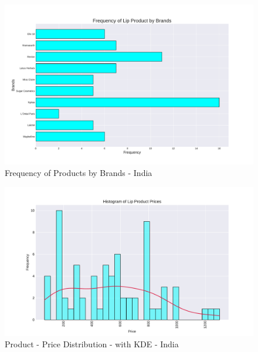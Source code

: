 \documentclass{article}
\begin{document}
\begin{center}
    \begin{figure}[htbp]
        \centering
        \includegraphics[scale=0.5]{../images/India-graphs/Brand_Frequency.pdf}
        \caption{Frequency of Products by Brands - India}
        \label{Products_by_Brands_ind}
    \end{figure}

    \begin{figure}[htbp]
        \centering
        \includegraphics[scale=0.6]{../images/India-graphs/KDE_Prices.pdf}
        \caption{Product - Price Distribution - with KDE - India}
        \label{KDE_Prices_ind}
    \end{figure}


\end{center}
\end{document}
